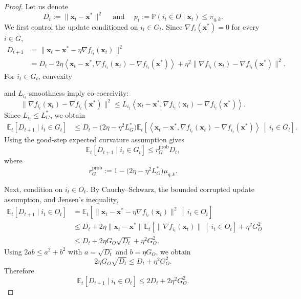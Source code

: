 \documentclass[11pt]{article}
\newcommand{\ve}[1]{\mathbf{#1}}
\begin{document}
\begin{proof}
Let us denote
\[
D_t:=\|\ve{x}_t-\ve{x}^*\|^2 \quad \text{ and } \quad p_t:=\mathbb{P}(i_t\in O\mid \ve{x}_t) \le \pi_{q,k}.
\]
We first control the update conditioned on \(i_t\in G_t\).
Since
\(\nabla f_i(\ve{x}^*)=0\) for every \(i\in G\),
\begin{align*}
D_{t+1}
&=
\|\ve{x}_t-\ve{x}^*-\eta\nabla f_{i_t}(\ve{x}_t)\|^2 \\
&=
D_t
-2\eta
\left\langle
\ve{x}_t-\ve{x}^*,
\nabla f_{i_t}(\ve{x}_t)-\nabla f_{i_t}(\ve{x}^*)
\right\rangle
+\eta^2
\|\nabla f_{i_t}(\ve{x}_t)-\nabla f_{i_t}(\ve{x}^*)\|^2.
\end{align*}
For \(i_t\in G_t\), convexity

and \(L_{i_t}\)-smoothness imply co-coercivity:
\[
\|\nabla f_{i_t}(\ve{x}_t)-\nabla f_{i_t}(\ve{x}^*)\|^2
\le
L_{i_t}
\left\langle
\ve{x}_t-\ve{x}^*,
\nabla f_{i_t}(\ve{x}_t)-\nabla f_{i_t}(\ve{x}^*)
\right\rangle.
\]
Since \(L_{i_t}\le {L_G^*}\),
we obtain
\begin{align*}
\mathbb{E}_t[D_{t+1}\mid i_t\in G_t]
&\le
D_t
-
\bigl(2\eta-\eta^2 {L_G^*}
\bigr)
\mathbb{E}_t\!\left[
\left\langle
\ve{x}_t-\ve{x}^*,
\nabla f_{i_t}(\ve{x}_t)-\nabla f_{i_t}(\ve{x}^*)
\right\rangle
\,\middle|\,
i_t\in G_t
\right].
\end{align*}
Using the good-step expected curvature assumption gives
\[
\mathbb{E}_t[D_{t+1}\mid i_t\in G_t]
\le
r_G^{\mathrm{prob}}D_t,
\]
where
\[
r_G^{\mathrm{prob}}
:=
1-\bigl(2\eta-\eta^2L_{G}^*\bigr)\mu_{q,k}.
\]

Next, condition on \(i_t\in O_t\). By Cauchy--Schwarz, the bounded corrupted
update assumption, {and Jensen's inequality,}
\begin{align*}
\mathbb{E}_t[D_{t+1}\mid i_t\in O_t]
&=
\mathbb{E}_t\!\left[
\|\ve{x}_t-\ve{x}^*-\eta\nabla f_{i_t}(\ve{x}_t)\|^2
\,\middle|\,
i_t\in O_t
\right] \\
&\le
D_t
+
2\eta \|\ve{x}_t-\ve{x}^*\|
\mathbb{E}_t\!\left[
\|\nabla f_{i_t}(\ve{x}_t)\|
\,\middle|\,
i_t\in O_t
\right]
+
\eta^2G_O^2 \\
&\le
D_t
+
2\eta G_O\sqrt{D_t}
+
\eta^2G_O^2.
\end{align*}
Using \(2ab\le a^2+b^2\) with \(a=\sqrt{D_t}\) and \(b=\eta G_O\), we obtain
\[
2\eta G_O\sqrt{D_t}
\le
D_t+\eta^2G_O^2.
\]
Therefore
\[
\mathbb{E}_t[D_{t+1}\mid i_t\in O_t]
\le
2D_t+2\eta^2G_O^2.
\]


\end{proof}
\end{document}
